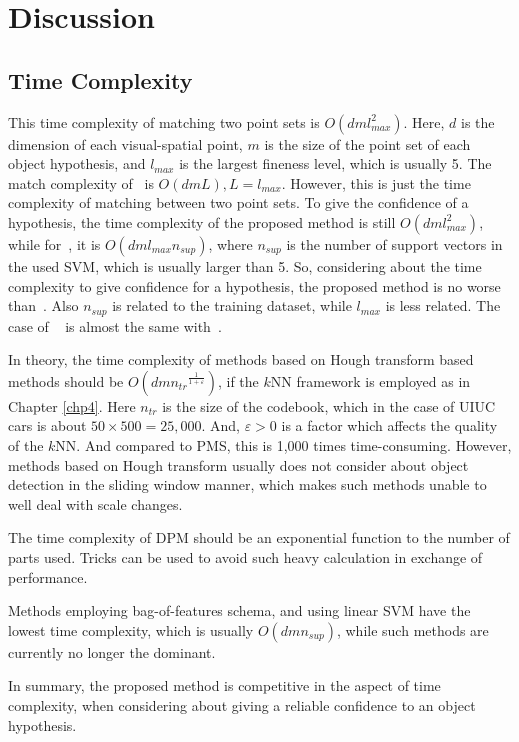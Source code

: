 \section{Discussion}
\label{dis5}
\subsection{Time Complexity}
This time complexity of matching two point sets is $O(dml_{max}^2)$. Here, $d$ is the dimension of each visual-spatial point, $m$ is the size of the point set of each object hypothesis, and $l_{max}$ is the largest fineness level, which is usually 5. The match complexity of~\citep{pmk} is $O(dmL), L=l_{max}$. However, this is just the time complexity of matching between two point sets. To give the confidence of a hypothesis, the time complexity of the proposed method is still $O(dml_{max}^2)$, while for~\citep{pmk}, it is $O(dml_{max}n_{sup})$, where $n_{sup}$ is the number of support vectors in the used SVM, which is usually larger than 5. So, considering about the time complexity to give confidence for a hypothesis, the proposed method is no worse than~\citep{pmk}. Also $n_{sup}$ is related to the training dataset, while $l_{max}$ is less related. The case of ~\citep{spmk} is almost the same with~\citep{pmk}.

In theory, the time complexity of methods based on Hough transform based methods should be $O(dm{n_{tr}}^{\frac 1 {1+\varepsilon}})$, if the $k$NN framework is employed as in Chapter \ref{chp4}. Here $n_{tr}$ is the size of the codebook, which in the case of UIUC cars is about $50\times 500=25,000$. And, $\varepsilon > 0$ is a factor which affects the quality of the $k$NN. And compared to PMS, this is 1,000 times time-consuming. However, methods based on Hough transform usually does not consider about object detection in the sliding window manner, which makes such methods unable to well deal with scale changes.

The time complexity of DPM should be an exponential function to the number of parts used. Tricks can be used to avoid such heavy calculation in exchange of performance.

Methods employing bag-of-features schema, and using linear SVM have the lowest time complexity, which is usually  $O(dmn_{sup})$, while such methods are currently no longer the dominant.

In summary, the proposed method is competitive in the aspect of time complexity, when considering about giving a reliable confidence to an object hypothesis.


